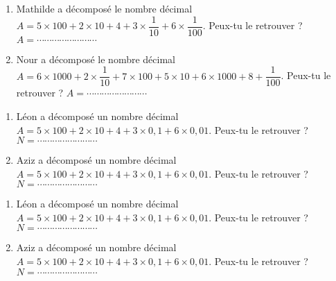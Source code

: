  


\begin{enumerate}
\item Mathilde a décomposé le nombre décimal  $A = 5\times 100 + 2\times 10 + 4 + 3\times \dfrac{1}{10} +  6\times \dfrac{1}{100} $. Peux-tu le retrouver ?
$A = \cdots\cdots\cdots\cdots\cdots\cdots\cdots\cdots $

\item Nour a décomposé le nombre décimal  $A = 6\times 1000 + 2\times \dfrac{1}{10} +  7\times 100 + 5\times 10 + 6\times 1000 + 8 +   \dfrac{1}{100} $. Peux-tu le retrouver ?
$A = \cdots\cdots\cdots\cdots\cdots\cdots\cdots\cdots $
\end{enumerate}



\begin{enumerate}
\item Léon a décomposé un nombre décimal  $A = 5\times 100 + 2\times 10 + 4 + 3\times 0,1 +  6\times 0,01 $. Peux-tu le retrouver ?
$N = \cdots\cdots\cdots\cdots\cdots\cdots\cdots\cdots $

\item Aziz a décomposé un nombre décimal  $A = 5\times 100 + 2\times 10 + 4 + 3\times 0,1 +  6\times 0,01 $. Peux-tu le retrouver ?
$N = \cdots\cdots\cdots\cdots\cdots\cdots\cdots\cdots $

\end{enumerate}


\begin{enumerate}
\item Léon a décomposé un nombre décimal  $A = 5\times 100 + 2\times 10 + 4 + 3\times 0,1 +  6\times 0,01 $. Peux-tu le retrouver ?
$N = \cdots\cdots\cdots\cdots\cdots\cdots\cdots\cdots $

\item Aziz a décomposé un nombre décimal  $A = 5\times 100 + 2\times 10 + 4 + 3\times 0,1 +  6\times 0,01 $. Peux-tu le retrouver ?
$N = \cdots\cdots\cdots\cdots\cdots\cdots\cdots\cdots $

\end{enumerate}
